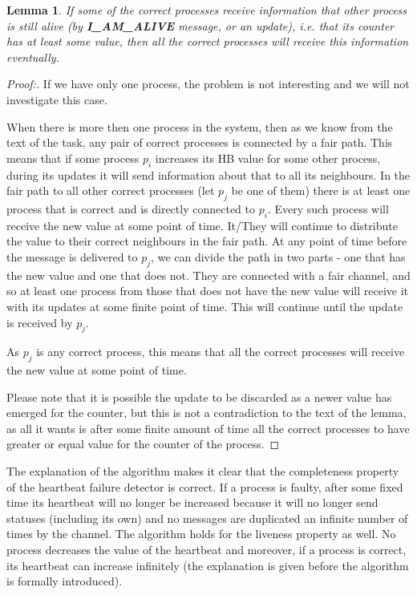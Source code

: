 \documentclass[12pt]{article}
\theoremstyle{plain}
\begin{document}
\newtheorem*{lem1}{Lemma}
\begin{lem1}
  If some of the correct processes receive information that other process is still
  alive (by \textbf{I\_AM\_ALIVE} message, or an update), i.e. that its counter
  has at least some value, then all the correct processes will receive this
  information eventually.
\end{lem1}
\begin{proof}[Proof:]
  If we have only one process, the problem is not interesting and we will not
  investigate this case.
  
  When there is more then one process in the system, then as we know from the
  text of the task, any pair of correct processes is connected by a fair path.
  This means that if some process $p_i$ increases its HB value for some other
  process, during its updates it will send information about that to all its
  neighbours. In the fair path to all other correct processes (let $p_j$ be 
  one of them) there is at least one process that is correct and is directly
  connected to $p_i$. Every such process will receive the new value at some
  point of time. It/They will continue to distribute the value to their correct
  neighbours in the fair path. At any point of time before the message is
  delivered to $p_j$, we can divide the path in two parts - one that has the new
  value and one that does not. They are connected with a fair channel, and so
  at least one process from those that does not have the new value will receive 
  it with its updates at some finite point of time. This will continue until
  the update is received by $p_j$.
  
  As $p_j$ is any correct process, this means that all the correct processes
  will receive the new value at some point of time.

  Please note that it is possible the update to be discarded as a newer value
  has emerged for the counter, but this is not a contradiction to the text of 
  the lemma, as all it wants is after some finite amount of time all the correct
  processes to have greater or equal value for the counter of the process.
\end{proof}
  
The explanation of the algorithm makes it clear that the completeness property
of the heartbeat failure detector is correct. If a process is faulty, after some
fixed time its heartbeat will no longer be increased because it will no longer
send statuses (including its own) and no messages are duplicated an infinite 
number of times by the channel. The algorithm holds for the liveness property
as well. No process decreases the value of the heartbeat and moreover, if a
process is correct, its heartbeat can increase infinitely (the explanation is
given before the algorithm is formally introduced).
\end{document}
